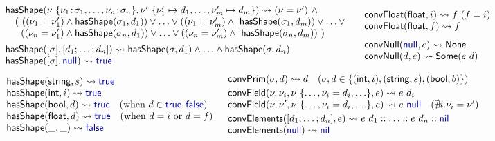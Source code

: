 \documentclass[10pt,preprint,blind,clearpagebib]{sigplanconf}
\newcommand{\kvd}[1]{\textnormal{\textcolor{kvdclr}{\sffamily #1}}}
\newcommand{\ident}[1]{\textnormal{\sffamily #1}}
\newcommand{\reduce}{\rightsquigarrow}
\begin{document}
\begin{figure}
\noindent
\begin{equation*}
\hspace{1.1em}
\begin{array}{l}
\ident{hasShape}(\nu~ \{ \nu_1 \!:\! \sigma_1, \ldots, \nu_n \!:\! \sigma_n \}, \nu'~\{ \nu'_1\mapsto d_1, \ldots, \nu'_m\mapsto d_m \}) \reduce (\nu = \nu') ~\wedge \\
  \quad (~ ((\nu_1 = \nu'_1) \wedge \ident{hasShape}(\sigma_1, d_1)) \vee\ldots\vee ((\nu_1 = \nu'_m) \wedge \ident{hasShape}(\sigma_1, d_m)) \vee \ldots \vee\\
  \quad ~\; ((\nu_n = \nu'_1) \wedge \ident{hasShape}(\sigma_n, d_1)) \vee\ldots\vee ((\nu_n = \nu'_m) \wedge \ident{hasShape}(\sigma_n, d_m))~)
\\[0.5em]
\ident{hasShape}([\sigma], [d_1; \ldots; d_n]) \reduce \ident{hasShape}(\sigma, d_1)\wedge\ldots\wedge\ident{hasShape}(\sigma, d_n) \\
\ident{hasShape}([\sigma], \kvd{null}) \reduce \kvd{true} 
\end{array}  
\quad
\begin{array}{l}
\ident{convFloat}(\ident{float}, i) \reduce f~(f=i) \\
\ident{convFloat}(\ident{float}, f) \reduce f \\[0.75em]
\ident{convNull}(\kvd{null}, e) \reduce \ident{None} \\
\ident{convNull}(d, e) \reduce \ident{Some}(e~d) 
\end{array}
\end{equation*}
%
\vspace{-0.75em}
%
\begin{equation*}
\begin{array}{l}
\ident{hasShape}(\ident{string}, s) \reduce \kvd{true} \\
\ident{hasShape}(\ident{int}, i) \reduce \kvd{true}\\
\ident{hasShape}(\ident{bool}, d) \reduce \kvd{true} \quad(\textnormal{when}~d\in{\kvd{true},\kvd{false}} )\\
\ident{hasShape}(\ident{float}, d) \reduce \kvd{true} \quad(\textnormal{when}~d=i ~\textnormal{or}~ d=f) \\
\ident{hasShape}(\_, \_) \reduce \kvd{false} \\
\end{array}
\;\;
\begin{array}{l}
\ident{convPrim}(\sigma, d) \reduce d\quad(\sigma,d\in\{ (\ident{int},i),(\ident{string},s),(\ident{bool}, b) \})
\\[0.25em]
\ident{convField}(\nu,\nu_i, \nu~\{\ldots, \nu_i=d_i, \ldots\}, e) \reduce e~d_i\\
\ident{convField}(\nu,\nu', \nu~\{\ldots, \nu_i=d_i, \ldots\}, e) \reduce e~\kvd{null}\quad(\nexists i.\nu_i=\nu' )
\\[0.25em]
\ident{convElements}([d_1; \ldots; d_n], e) \reduce e~d_1 :: \ldots :: e~d_n :: \kvd{nil}  \\  
\ident{convElements}(\kvd{null}) \reduce \kvd{nil}
\end{array}
\end{equation*}


\end{figure}
\end{document}
